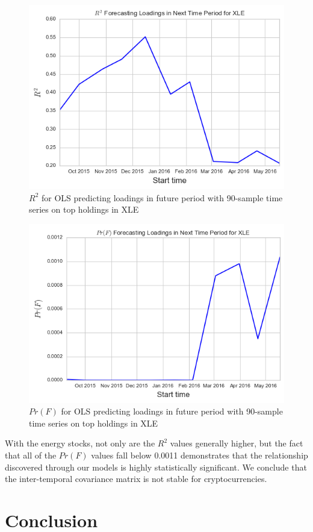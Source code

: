 \documentclass[12pt,twoside]{article}
\begin{document}
\bigbreak
\begin{figure}[H]
	\centering
	\includegraphics[scale=.7]{xle_R2_90D.png}
	\caption{$R^2$ for OLS predicting loadings in future period with 90-sample time series on top holdings in XLE}
	\label{fig:xle_R2}
\end{figure}
\bigbreak

\bigbreak
\begin{figure}[H]
	\centering
	\includegraphics[scale=.7]{xle_F_90D.png}
	\caption{$Pr(F)$ for OLS predicting loadings in future period with 90-sample time series on top holdings in XLE}
	\label{fig:xle_F}
\end{figure}
\bigbreak


With the energy stocks, not only are the $R^2$ values generally higher, but the fact that all of the $Pr(F)$ values fall below 0.0011 demonstrates that the relationship discovered through our models is highly statistically significant. We conclude that the inter-temporal covariance matrix is not stable for cryptocurrencies.

\section{Conclusion}
\end{document}
